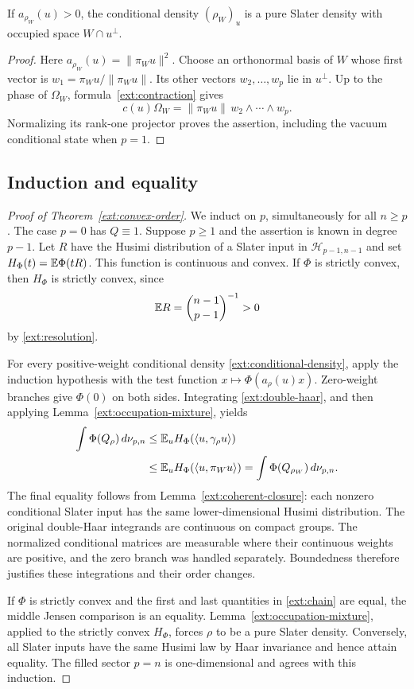 \begin{lemma}
\label{ext:coherent-closure}
If $a_{\rho_W}(u)>0$, the conditional density $(\rho_W)_u$ is a
pure Slater density with occupied space $W\cap u^\perp$.
\end{lemma}
\begin{proof}
Here $a_{\rho_W}(u)=\|\pi_Wu\|^2$. Choose an orthonormal basis of
$W$ whose first vector is $w_1=\pi_Wu/\|\pi_Wu\|$.
Its other vectors $w_2,\ldots,w_p$ lie in $u^\perp$.
Up to the phase of $\Omega_W$, formula~\eqref{ext:contraction} gives
\[
 c(u)\Omega_W
 =\|\pi_Wu\|\,w_2\wedge\cdots\wedge w_p.
\]
Normalizing its rank-one projector proves the assertion, including
the vacuum conditional state when $p=1$.
\end{proof}

\subsection{Induction and equality}

\begin{proof}[Proof of Theorem~\ref{ext:convex-order}]
We induct on $p$, simultaneously for all $n\ge p$. The case $p=0$
has $Q\equiv1$. Suppose $p\ge1$ and the assertion is known in
degree $p-1$. Let $R$ have the Husimi distribution of a Slater input
in $\mathcal H_{p-1,n-1}$ and set $H_\Phi(t)=\mathbb E\Phi(tR)$.
This function is continuous and convex. If $\Phi$ is strictly
convex, then $H_\Phi$ is strictly convex, since
\[
 \mathbb E R=\binom{n-1}{p-1}^{-1}>0
\]
by \eqref{ext:resolution}.

For every positive-weight conditional density \eqref{ext:conditional-density},
apply the induction hypothesis with the test function
$x\mapsto\Phi(a_\rho(u)x)$. Zero-weight branches give $\Phi(0)$
on both sides. Integrating \eqref{ext:double-haar}, and then applying
Lemma~\ref{ext:occupation-mixture}, yields
\begin{align}
 \int\Phi(Q_\rho)\,d\nu_{p,n}
 &\le\mathbb E_u H_\Phi(\langle u,\gamma_\rho u\rangle)\notag\\
 &\le\mathbb E_u H_\Phi(\langle u,\pi_Wu\rangle)
 =\int\Phi(Q_{\rho_W})\,d\nu_{p,n}.
 \label{ext:chain}
\end{align}
The final equality follows from Lemma~\ref{ext:coherent-closure}:
each nonzero conditional Slater input has the same lower-dimensional
Husimi distribution. The original double-Haar integrands are continuous
on compact groups. The normalized conditional matrices are measurable
where their continuous weights are positive, and the zero branch was
handled separately. Boundedness therefore justifies these integrations
and their order changes.

If $\Phi$ is strictly convex and the first and last quantities in
\eqref{ext:chain} are equal, the middle Jensen comparison is an
equality. Lemma~\ref{ext:occupation-mixture}, applied to the strictly
convex $H_\Phi$, forces $\rho$ to be a pure Slater density.
Conversely, all Slater inputs have the same Husimi law by Haar
invariance and hence attain equality. The filled sector $p=n$ is
one-dimensional and agrees with this induction.
\end{proof}

